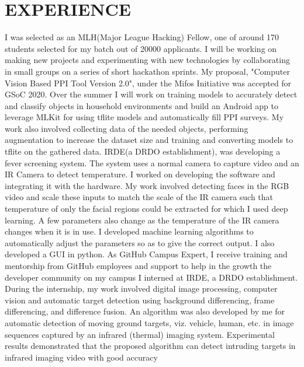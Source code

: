 \documentclass[10pt,a4paper,sans]{moderncv}        %
\begin{document}
\section{EXPERIENCE}
{I was selected as an MLH(Major League Hacking) Fellow, one of around 170 students selected for my batch out of 20000 applicants. I will be working on making new projects and experimenting with new technologies by collaborating in small groups on a series of short hackathon sprints.}
{My proposal, "Computer Vision Based PPI Tool Version 2.0", under the Mifos Initiative was accepted for GSoC 2020. Over the summer I will work on training models to accurately detect and classify objects in household environments and build an Android app to leverage MLKit for using tflite models and automatically fill PPI surveys. My work also involved collecting data of the needed objects, performing augmentation to increase the dataset size and training and converting models to tflite on the gathered data. }
{IRDE(a DRDO establishment), was developing a fever screening system. The system uses a normal camera to capture video and an IR Camera to detect temperature. I worked on developing the software and integrating it with the hardware. My work involved detecting faces in the RGB video and scale these inputs to match the scale of the IR camera such that temperature of only the facial regions could be extracted for which I used deep learning. A few parameters also change as the temperature of the IR camera changes when it is in use. I developed machine learning algorithms to automatically adjust the parameters so as to give the correct output. I also developed a GUI in python.}
{As GitHub Campus Expert, I receive training and mentorship from GitHub employees and support to help in the growth the developer community on my campus}
{I interned at IRDE, a DRDO establishment. During the internship, my work involved digital image processing, computer vision and automatic target detection using background differencing, frame differencing, and difference fusion. An algorithm was also developed by me for automatic detection of moving ground targets, viz. vehicle, human, etc. in image sequences captured by an infrared (thermal) imaging system. Experimental results demonstrated that the proposed algorithm can detect intruding targets in infrared imaging video with good accuracy}
\end{document}
